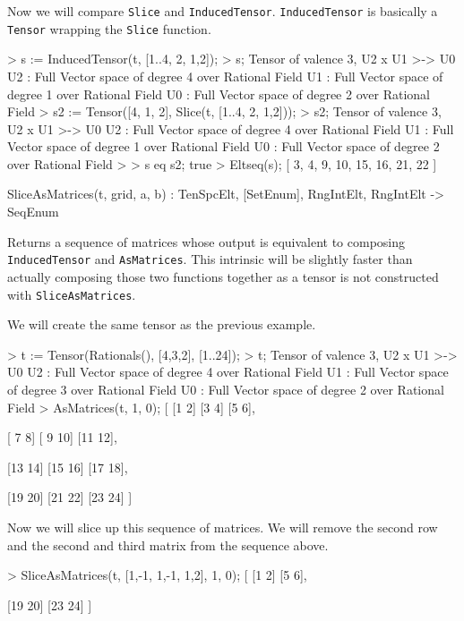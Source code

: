 \begin{example}[TensorSlicing]
Now we will compare \texttt{Slice} and \texttt{InducedTensor}. 
\texttt{InducedTensor} is basically a \texttt{Tensor} wrapping the \texttt{Slice} function.
\begin{code}
> s := InducedTensor(t, [{1..4}, {2}, {1,2}]);
> s;
Tensor of valence 3, U2 x U1 >-> U0
U2 : Full Vector space of degree 4 over Rational Field
U1 : Full Vector space of degree 1 over Rational Field
U0 : Full Vector space of degree 2 over Rational Field
> s2 := Tensor([4, 1, 2], Slice(t, [{1..4}, {2}, {1,2}]));
> s2;
Tensor of valence 3, U2 x U1 >-> U0
U2 : Full Vector space of degree 4 over Rational Field
U1 : Full Vector space of degree 1 over Rational Field
U0 : Full Vector space of degree 2 over Rational Field
> 
> s eq s2;
true
> Eltseq(s);
[ 3, 4, 9, 10, 15, 16, 21, 22 ]
\end{code}
\end{example}

\begin{intrinsics}
SliceAsMatrices(t, grid, a, b) : TenSpcElt, [SetEnum], RngIntElt, RngIntElt -> SeqEnum
\end{intrinsics}

Returns a sequence of matrices whose output is equivalent to composing \texttt{InducedTensor} and \texttt{AsMatrices}.
This intrinsic will be slightly faster than actually composing those two functions together as a tensor is not constructed with \texttt{SliceAsMatrices}.

\begin{example}[SliceAsMatrices]

We will create the same tensor as the previous example.
\begin{code}
> t := Tensor(Rationals(), [4,3,2], [1..24]);
> t;
Tensor of valence 3, U2 x U1 >-> U0
U2 : Full Vector space of degree 4 over Rational Field
U1 : Full Vector space of degree 3 over Rational Field
U0 : Full Vector space of degree 2 over Rational Field
> AsMatrices(t, 1, 0);
[
    [1 2]
    [3 4]
    [5 6],

    [ 7  8]
    [ 9 10]
    [11 12],

    [13 14]
    [15 16]
    [17 18],

    [19 20]
    [21 22]
    [23 24]
]
\end{code}

Now we will slice up this sequence of matrices. 
We will remove the second row and the second and third matrix from the sequence above.
\begin{code}
> SliceAsMatrices(t, [{1,-1}, {1,-1}, {1,2}], 1, 0);
[
    [1 2]
    [5 6],

    [19 20]
    [23 24]
]
\end{code}
\end{example}


